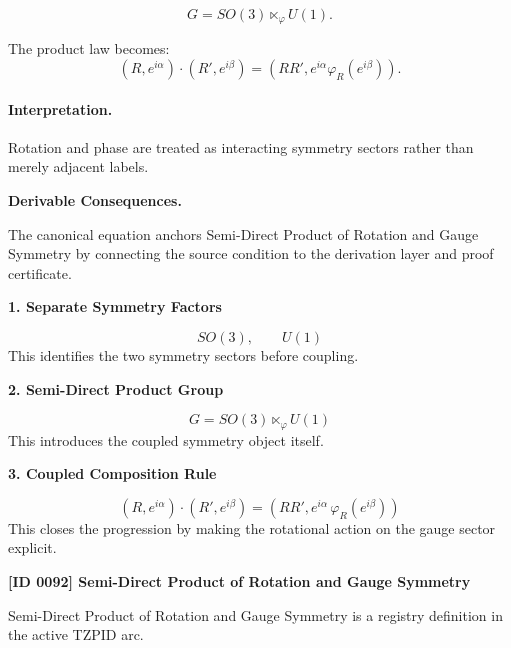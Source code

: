 \begin{equation}
G=SO(3)\ltimes_{\varphi}U(1).
\end{equation}

The product law becomes:
\begin{equation}
\boxed{
(R,e^{i\alpha})\cdot(R',e^{i\beta})
=
\left(
RR',
e^{i\alpha}\varphi_R(e^{i\beta})
\right).
}
\end{equation}

\paragraph{Interpretation.}
Rotation and phase are treated as interacting symmetry sectors rather than merely adjacent labels.

\par\vspace{0.35em}
\noindent\textbf{Derivable Consequences.}\quad
\begingroup
\footnotesize
\raggedright
The canonical equation anchors Semi-Direct Product of Rotation and Gauge Symmetry by connecting the source condition to the derivation layer and proof certificate.
\par\endgroup

\noindent\textbf{1. Separate Symmetry Factors}\par
\[
SO(3),\qquad U(1)
\]
\noindent This identifies the two symmetry sectors before coupling.\par
\noindent\textbf{2. Semi-Direct Product Group}\par
\[
G = SO(3) \ltimes_{\varphi} U(1)
\]
\noindent This introduces the coupled symmetry object itself.\par
\noindent\textbf{3. Coupled Composition Rule}\par
\[
(R,e^{i\alpha})\cdot(R',e^{i\beta})
=
\left(RR', e^{i\alpha}\,\varphi_R(e^{i\beta})\right)
\]
\noindent This closes the progression by making the rotational action on the gauge sector explicit.\par

\clearpage
\noindent\textbf{[ID 0092] Semi-Direct Product of Rotation and Gauge Symmetry}\par
\vspace{0.35em}
\begingroup\small
{}
Semi-Direct Product of Rotation and Gauge Symmetry is a registry definition in the active TZPID arc.

